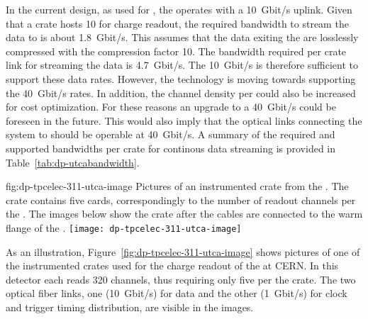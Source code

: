 In the current design, as used for , the  operates with a \SI{10}{Gbit/s} uplink. Given that a  crate hosts \num{10}  for charge readout, the required bandwidth to stream the data to  is about \SI{1.8}{Gbit/s}. This assumes that the data exiting the  are losslessly compressed with the compression factor \num{10}. The bandwidth required per crate link for streaming the  data is \SI{4.7}{Gbit/s}. The \SI{10}{Gbit/s}  is therefore sufficient to support these data rates. However, the technology is moving towards supporting the \SI{40}{Gbit/s} rates. In addition, the channel density per  could also be increased for cost optimization. For these reasons an upgrade to a \SI{40}{Gbit/s}  could be foreseen in the future. This would also imply that the optical links connecting the  system to   should be operable at \SI{40}{Gbit/s}. A summary of the required and supported bandwidths per  crate for continous data streaming is provided in Table~\ref{tab:dp-utcabandwidth}.


\begin{dunefigure}{fig:dp-tpcelec-311-utca-image}
{Pictures of an instrumented  crate from the . The crate contains five  cards, correspondingly to the number of readout channels per the . The images below show the crate after the  cables are connected to the warm flange of the .}
\texttt{[image: dp-tpcelec-311-utca-image]}
\end{dunefigure}

As an illustration, Figure~\ref{fig:dp-tpcelec-311-utca-image} shows pictures of one of the instrumented  crates used for the charge readout of the  at CERN. In this detector each  reads \num{320} channels, thus requiring only five  per the  crate. The two optical fiber links, one (\SI{10}{Gbit/s}) for data and the other (\SI{1}{Gbit/s}) for clock and trigger timing distribution, are visible in the images.       

